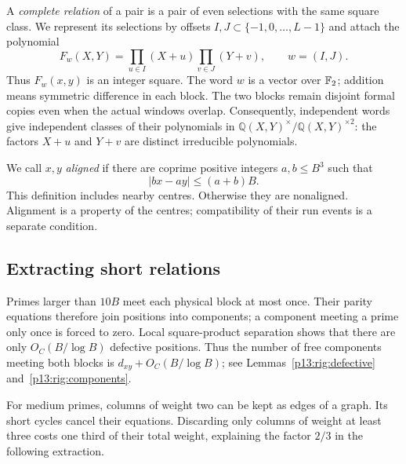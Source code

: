 A \emph{complete relation} of a pair is a pair of even selections
with the same square class.  We represent its selections by offsets
$I,J\subset\{-1,0,\ldots,L-1\}$ and attach the polynomial
\begin{equation}
 F_w(X,Y)=\prod_{u\in I}(X+u)\prod_{v\in J}(Y+v),
 \qquad w=(I,J).
 \label{p13:rig:word-polynomial}
\end{equation}
Thus $F_w(x,y)$ is an integer square.  The word $w$ is a vector
over $\mathbb F_2$; addition means symmetric difference in each block.
The two blocks remain disjoint formal copies even when the actual
windows overlap.  Consequently, independent words give independent
classes of their polynomials in
$\mathbb Q(X,Y)^\times/\mathbb Q(X,Y)^{\times2}$: the factors
$X+u$ and $Y+v$ are distinct irreducible polynomials.

We call $x,y$ \emph{aligned} if there are coprime positive integers
$a,b\le B^3$ such that
\begin{equation}
                   |bx-ay|\le(a+b)B.
 \label{p13:rig:alignment}
\end{equation}
This definition includes nearby centres.  Otherwise they are
nonaligned.  Alignment is a property of the centres; compatibility
of their run events is a separate condition.


\subsection{Extracting short relations}

Primes larger than $10B$ meet each physical block at most once.  Their
parity equations therefore join positions into components; a component
meeting a prime only once is forced to zero.  Local square-product
separation shows that there are only $O_C(B/\log B)$ defective
positions.  Thus the number of free components meeting both blocks is
$d_{xy}+O_C(B/\log B)$; see
Lemmas~\ref{p13:rig:defective} and~\ref{p13:rig:components}.

For medium primes, columns of weight two can be kept as edges of a
graph.  Its short cycles cancel their equations.  Discarding only
columns of weight at least three costs one third of their total
weight, explaining the factor $2/3$ in the following extraction.

